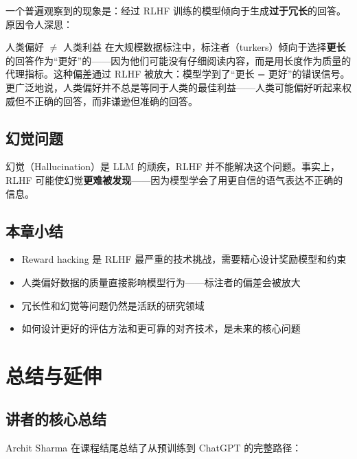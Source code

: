 \documentclass[a4paper]{article}
\begin{document}
一个普遍观察到的现象是：经过 RLHF 训练的模型倾向于生成\textbf{过于冗长}的回答。原因令人深思：

\begin{warningbox}{人类偏好 $\neq$ 人类利益}
在大规模数据标注中，标注者（turkers）倾向于选择\textbf{更长}的回答作为``更好''的——因为他们可能没有仔细阅读内容，而是用长度作为质量的代理指标。这种偏差通过 RLHF 被放大：模型学到了``更长 = 更好''的错误信号。更广泛地说，人类偏好并不总是等同于人类的最佳利益——人类可能偏好听起来权威但不正确的回答，而非谦逊但准确的回答。
\end{warningbox}

\subsection{幻觉问题}

幻觉（Hallucination）是 LLM 的顽疾，RLHF 并不能解决这个问题。事实上，RLHF 可能使幻觉\textbf{更难被发现}——因为模型学会了用更自信的语气表达不正确的信息。

\subsection{本章小结}

\begin{itemize}
    \item Reward hacking 是 RLHF 最严重的技术挑战，需要精心设计奖励模型和约束
    \item 人类偏好数据的质量直接影响模型行为——标注者的偏差会被放大
    \item 冗长性和幻觉等问题仍然是活跃的研究领域
    \item 如何设计更好的评估方法和更可靠的对齐技术，是未来的核心问题
\end{itemize}


\section{总结与延伸}

\subsection{讲者的核心总结}





Archit Sharma 在课程结尾总结了从预训练到 ChatGPT 的完整路径：
\end{document}

